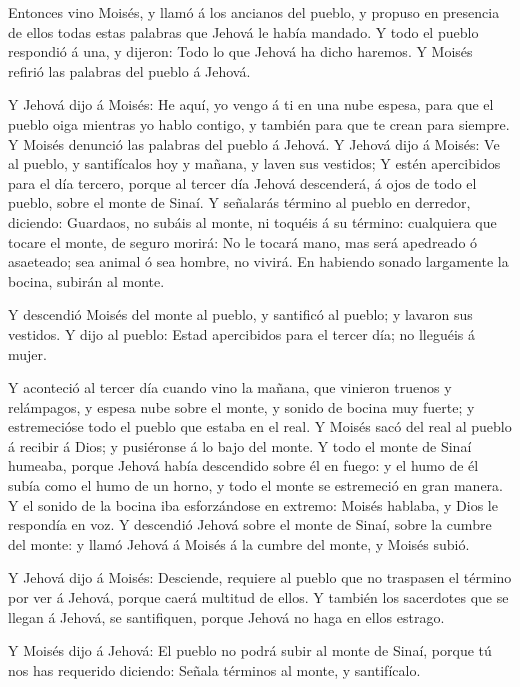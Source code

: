  Entonces vino Moisés, y llamó á los ancianos del pueblo, y
propuso en presencia de ellos todas estas palabras que Jehová le había
mandado.  Y todo el pueblo respondió á una, y dijeron: Todo
lo que Jehová ha dicho haremos. Y Moisés refirió las palabras del pueblo
á Jehová.

 Y Jehová dijo á Moisés: He aquí, yo vengo á ti en una nube
espesa, para que el pueblo oiga mientras yo hablo contigo, y también
para que te crean para siempre. Y Moisés denunció las palabras del
pueblo á Jehová.  Y Jehová dijo á Moisés: Ve al pueblo, y
santifícalos hoy y mañana, y laven sus vestidos;  Y estén
apercibidos para el día tercero, porque al tercer día Jehová descenderá,
á ojos de todo el pueblo, sobre el monte de Sinaí.  Y
señalarás término al pueblo en derredor, diciendo: Guardaos, no subáis
al monte, ni toquéis á su término: cualquiera que tocare el monte, de
seguro morirá:  No le tocará mano, mas será apedreado ó
asaeteado; sea animal ó sea hombre, no vivirá. En habiendo sonado
largamente la bocina, subirán al monte.

 Y descendió Moisés del monte al pueblo, y santificó al
pueblo; y lavaron sus vestidos.  Y dijo al pueblo: Estad
apercibidos para el tercer día; no lleguéis á mujer.

 Y aconteció al tercer día cuando vino la mañana, que
vinieron truenos y relámpagos, y espesa nube sobre el monte, y sonido de
bocina muy fuerte; y estremecióse todo el pueblo que estaba en el real.
 Y Moisés sacó del real al pueblo á recibir á Dios; y
pusiéronse á lo bajo del monte.  Y todo el monte de Sinaí
humeaba, porque Jehová había descendido sobre él en fuego: y el humo de
él subía como el humo de un horno, y todo el monte se estremeció en gran
manera.  Y el sonido de la bocina iba esforzándose en
extremo: Moisés hablaba, y Dios le respondía en voz.  Y
descendió Jehová sobre el monte de Sinaí, sobre la cumbre del monte: y
llamó Jehová á Moisés á la cumbre del monte, y Moisés subió.

 Y Jehová dijo á Moisés: Desciende, requiere al pueblo que
no traspasen el término por ver á Jehová, porque caerá multitud de
ellos.  Y también los sacerdotes que se llegan á Jehová, se
santifiquen, porque Jehová no haga en ellos estrago.

 Y Moisés dijo á Jehová: El pueblo no podrá subir al monte
de Sinaí, porque tú nos has requerido diciendo: Señala términos al
monte, y santifícalo.

